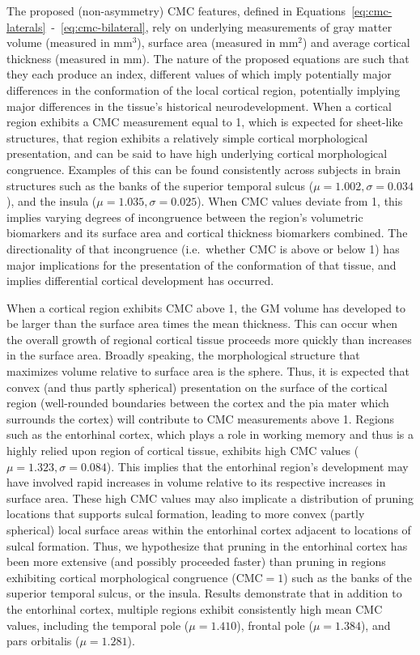\documentclass{article}
\newcommand{\CMC}{\(\text{CMC}\) }
\begin{document}
The proposed (non-asymmetry) \CMC features, defined in
Equations~\ref{eq:cmc-laterals}~-~\ref{eq:cmc-bilateral}, rely on underlying
measurements of gray matter volume (measured in mm\(^3\)), surface area
(measured in mm\(^2\)) and average cortical thickness (measured in mm). The
nature of the proposed equations are such that they each produce an index,
different values of which imply potentially major differences in the
conformation of the local cortical region, potentially implying major
differences in the tissue's historical neurodevelopment. When a cortical
region exhibits a \CMC measurement equal to 1, which is expected for
sheet-like structures, that region exhibits a relatively simple cortical
morphological presentation, and can be said to have high underlying cortical
morphological congruence. Examples of this can be found consistently across
subjects in brain structures such as the banks of the superior temporal
sulcus (\(\mu=1.002, \sigma=0.034\)), and the insula
(\(\mu=1.035, \sigma=0.025\)). When \CMC values deviate from
1, this implies varying degrees of incongruence between the region's
volumetric biomarkers and its surface area and cortical thickness biomarkers
combined. The directionality of that incongruence (i.e.\ whether \CMC is above
or below 1) has major implications for the presentation of the conformation
of that tissue, and implies differential cortical development has occurred.

When a cortical region exhibits \CMC above 1, the GM volume has developed to
be larger than the surface area times the mean thickness. This can occur when
the overall growth of regional cortical tissue proceeds more quickly than
increases in the surface area. Broadly speaking, the morphological structure
that maximizes volume relative to surface area is the sphere. Thus, it is
expected that convex (and thus partly spherical) presentation on the surface
of the cortical region (well-rounded boundaries between the cortex and the
pia mater which surrounds the cortex) will contribute to CMC measurements
above 1. Regions such as the entorhinal cortex, which plays a role in working
memory and thus is a highly relied upon region of cortical tissue, exhibits
high CMC values (\(\mu=1.323, \sigma=0.084\)). This implies that the
entorhinal region's development may have involved rapid increases in volume
relative to its respective increases in surface area. These high CMC values
may also implicate a distribution of pruning locations that supports sulcal
formation, leading to more convex (partly spherical) local surface areas
within the entorhinal cortex adjacent to locations of sulcal formation. Thus,
we hypothesize that pruning in the entorhinal cortex has been more extensive
(and possibly proceeded faster) than pruning in regions exhibiting cortical
morphological congruence (\(\text{CMC} = 1\)) such as the banks of the
superior temporal sulcus, or the insula. Results demonstrate that in addition
to the entorhinal cortex, multiple regions exhibit consistently high mean
\CMC values, including the temporal pole (\(\mu=1.410\)), frontal pole
(\(\mu=1.384\)), and pars orbitalis (\(\mu=1.281\)).
\end{document}
